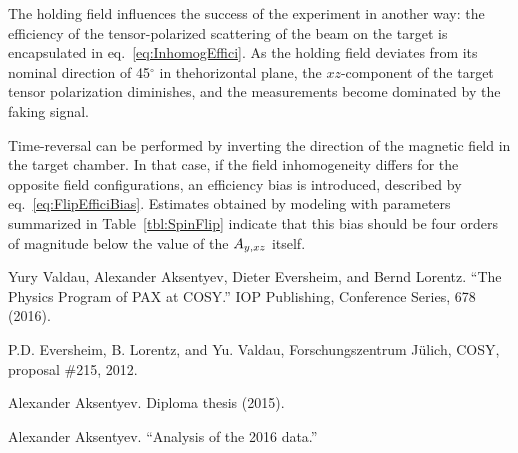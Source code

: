 \documentclass{article}
\begin{document}
The holding field influences the success of the experiment in another way: the efficiency of the tensor-polarized scattering of the beam on the target is encapsulated in eq.~\eqref{eq:InhomogEffici}. As the holding field deviates from its nominal direction of 45$^\circ$ in thehorizontal plane, the $xz$-component of the target tensor polarization diminishes, and the measurements become dominated by the faking signal.

Time-reversal can be performed by inverting the direction of the magnetic field in the target chamber. In that case, if the field inhomogeneity differs for the opposite field configurations, an efficiency bias is introduced, described by eq.~\eqref{eq:FlipEfficiBias}. Estimates obtained by modeling with parameters summarized in Table~\ref{tbl:SpinFlip} indicate that this bias should be four orders of magnitude below the value of the $\Ayxz$ itself.

\begin{thebibliography}{9}
	Yury Valdau, Alexander Aksentyev, Dieter Eversheim, and Bernd Lorentz. ``The Physics Program of PAX at COSY.'' IOP Publishing, Conference Series, 678 (2016).
	
	
		
	P.D. Eversheim, B. Lorentz, and Yu. Valdau, Forschungszentrum J\"ulich, COSY, proposal \#215, 2012.
	
	Alexander Aksentyev. Diploma thesis (2015).
	
	Alexander Aksentyev. ``Analysis of the 2016 data.''
\end{thebibliography}
\end{document}
